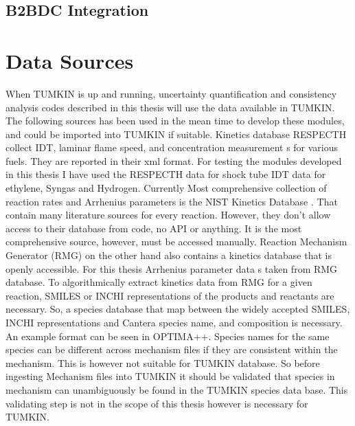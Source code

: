 \subsection{B2BDC Integration}

\section{Data Sources}
When TUMKIN is up  and running, uncertainty quantification and consistency analysis codes described in this thesis will use the data available in TUMKIN. The following sources has been used in the mean time to develop these modules, and  could be imported into TUMKIN if suitable. 
Kinetics database RESPECTH  \cite{turanyi_respecth_2025} collect IDT, laminar flame speed, and concentration measurement s for various fuels. They are reported in their xml format.  For testing the modules developed in this thesis I have used the RESPECTH data for shock tube IDT data for ethylene, Syngas and Hydrogen. 
Currently Most comprehensive collection of reaction rates and Arrhenius parameters is the NIST Kinetics Database 	\cite{j_a_manion_r_e_huie_r_d_levin_d_r_burgess_jr_v_l_orkin_w_tsang_w_s_mcgivern_j_w_hudgens_v_d_knyazev_d_b_atkinson_e_chai_a_m_tereza_c-y_lin_t_c_allison_w_g_mallard_f_westley_j_t_herron_r_f_hampson_and_d_h_frizzell_nist_nodate}. That contain many literature sources for every reaction. However, they don’t allow access to their database from code, no API or anything. It is the most comprehensive source, however, must be accessed manually. Reaction Mechanism Generator (RMG) on the other hand also contains a kinetics database that is openly accessible. For this thesis Arrhenius parameter data s taken from RMG database. To algorithmically extract kinetics data from RMG for a given reaction, SMILES or INCHI representations of the products and reactants are necessary. So, a species database that map between the widely accepted SMILES, INCHI representations and Cantera species name, and composition is necessary. An example format can be seen in OPTIMA++.  Species names for the same species can be different across mechanism files if they are consistent within the mechanism. This is however not suitable for TUMKIN database. So before ingesting Mechanism files into TUMKIN it should be validated that species in mechanism can unambiguously be found in the TUMKIN species data base. This validating step is not in the scope of this thesis however is necessary for TUMKIN.
